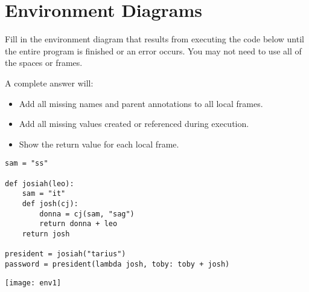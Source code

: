 \documentclass{exam}
\begin{document}
\section{Environment Diagrams}
\begin{questions}
\question Fill in the environment diagram that results from executing the code below until the entire program
is finished or an error occurs. You may not need to use all of the spaces or frames.

A complete answer will:
\begin{itemize}
\item Add all missing names and parent annotations to all local frames.
\item Add all missing values created or referenced during execution.
\item Show the return value for each local frame. 
\end{itemize}

\begin{lstlisting}
sam = "ss"

def josiah(leo):
    sam = "it"
    def josh(cj):
        donna = cj(sam, "sag") 
        return donna + leo
    return josh

president = josiah("tarius")
password = president(lambda josh, toby: toby + josh)
\end{lstlisting}

\begin{solution}
\texttt{[image: env1]}
\end{solution}

\clearpage

% 
% 
% 
% 
\end{questions}
\end{document}
